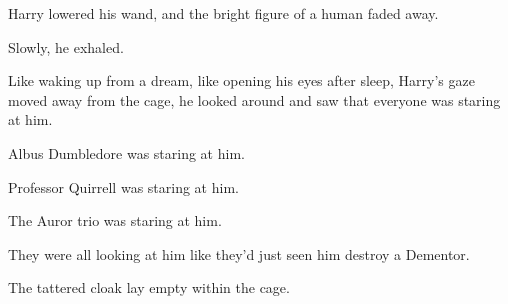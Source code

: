 Harry lowered his wand, and the bright figure of a human faded away.

Slowly, he exhaled.

Like waking up from a dream, like opening his eyes after sleep, Harry's gaze moved away from the cage, he looked around and saw that everyone was staring at him.

Albus Dumbledore was staring at him.

Professor Quirrell was staring at him.

The Auror trio was staring at him.

They were all looking at him like they'd just seen him destroy a Dementor.

The tattered cloak lay empty within the cage.

